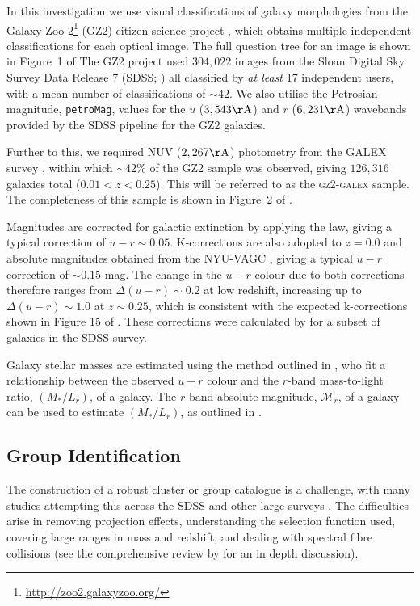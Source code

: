 \documentclass[useAMS,usenatbib]{mn2e}
\begin{document}
In this investigation we use visual classifications of galaxy morphologies from the Galaxy Zoo 2\footnote{\url{http://zoo2.galaxyzoo.org/}} (GZ2) citizen science project \citep{lintott09, GZ2}, which obtains multiple independent classifications for each optical image. The full question tree for an image is shown in Figure~1 of \citeauthor{GZ2}  The GZ2 project used $304, 022$ images from the Sloan Digital Sky Survey Data Release 7 (SDSS; \citealt{york00, abazajian09}) all classified by \emph{at least} 17 independent users, with a mean number of classifications of $\sim42$. We also utilise the Petrosian magnitude, {\tt petroMag}, values for the $u$ ($3,543 \rm{\AA}$) and $r$ ($6,231 \rm{\AA}$) wavebands provided by the SDSS pipeline for the GZ2 galaxies.

Further to this, we required NUV ($2,267 \rm{\AA}$) photometry from the GALEX survey \citep{martin05}, within which $\sim42\%$ of the GZ2 sample was observed, giving $126, 316$ galaxies total ($0.01 < z < 0.25$). This will be referred to as the \textsc{gz2-galex} sample. The completeness of this sample is shown in Figure~2 of \cite{smethurst15}. 

Magnitudes are corrected for galactic extinction \citep{Oh11} by applying the \citet{Cardelli89} law, giving a typical correction of $u-r \sim 0.05$. K-corrections are also adopted to $z=0.0$ and absolute magnitudes obtained from the NYU-VAGC \citep{Blanton05, padmanabhan08, blanton07}, giving a typical $u-r$ correction of $\sim 0.15$ mag. The change in the $u-r$ colour due to both corrections therefore ranges from $\Delta (u-r) \sim 0.2$ at low redshift, increasing up to $\Delta (u-r) \sim 1.0$ at $z \sim 0.25$, which is consistent with the expected k-corrections shown in Figure 15 of \citet{blanton07}. These corrections were calculated by \citet{Bamford09} for a subset of galaxies in the SDSS survey.

Galaxy stellar masses are estimated using the method outlined in \cite{Baldry06}, who fit a relationship between the observed $u-r$ colour and the $r$-band mass-to-light ratio, $(M_*/L_r)$, of a galaxy. The $r$-band absolute magnitude, $\mathcal{M}_r$, of a galaxy can be used to estimate $(M_*/L_r)$, as outlined in \cite{blanton01}. 


\subsection{Group Identification}\label{sec:groups}


The construction of a robust cluster or group catalogue is a challenge, with many studies attempting this across the SDSS \citep{merchan05, miller05, berlind06, yang07, tago08, tago10, tinker11, munoz12, tempel14} and other large surveys \citep{tucker00, merchan02, eke04, cucciati10, robotham11, knobel12}. The difficulties arise in removing projection effects, understanding the selection function used, covering large ranges in mass and redshift, and dealing with spectral fibre collisions (see the comprehensive review by \citet{postman02} for an in depth discussion). 
\end{document}
